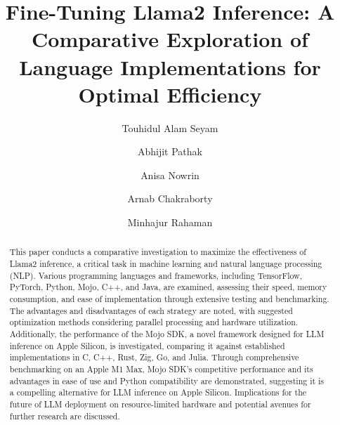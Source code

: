 \documentclass[sigconf]{acmart}
\begin{document}
\title{}
\title[Optimizing Llama2 Inference: Comparative Language Efficiency]{Fine-Tuning Llama2 Inference: A Comparative Exploration of Language Implementations for Optimal Efficiency}


\author{Touhidul Alam Seyam}

\author{Abhijit Pathak}

\author{Anisa Nowrin}

\author{Arnab Chakraborty}

\author{Minhajur Rahaman}



\renewcommand{\shortauthors}{Touhidul and Pathak, et al.}


\begin{abstract}
  This paper conducts a comparative investigation to maximize the effectiveness of Llama2 inference, a critical task in machine learning and natural language processing (NLP). Various programming languages and frameworks, including TensorFlow, PyTorch, Python, Mojo, C++, and Java, are examined, assessing their speed, memory consumption, and ease of implementation through extensive testing and benchmarking. The advantages and disadvantages of each strategy are noted, with suggested optimization methods considering parallel processing and hardware utilization. Additionally, the performance of the Mojo SDK, a novel framework designed for LLM inference on Apple Silicon, is investigated, comparing it against established implementations in C, C++, Rust, Zig, Go, and Julia. Through comprehensive benchmarking on an Apple M1 Max, Mojo SDK's competitive performance and its advantages in ease of use and Python compatibility are demonstrated, suggesting it is a compelling alternative for LLM inference on Apple Silicon. Implications for the future of LLM deployment on resource-limited hardware and potential avenues for further research are discussed.
\end{abstract}
\end{document}
